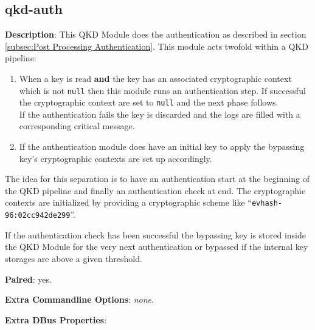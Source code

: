 \subsection{qkd-auth}
\label{subsec:qkd-auth}

\textbf{Description}: This QKD Module does the authentication as described in section \ref{subsec:Post Processing Authentication}. This module acts twofold within a QKD pipeline:

\begin{enumerate}

\item When a key is read \textbf{and} the key has an associated cryptographic context which is not \texttt{null} then this module runs an authentication step. If successful the cryptographic context are set to \texttt{null} and the next phase follows. \\[1em] If the authentication fails the key is discarded and the logs are filled with a corresponding critical message.

\item If the authentication module does have an initial key to apply the bypassing key's cryptographic contexts are set up accordingly.

\end{enumerate}

The idea for this separation is to have an authentication start at the beginning of the QKD pipeline and finally an authentication check at end. The cryptographic contexts are initialized by providing a cryptographic scheme like ``\texttt{evhash-96:02cc942de299}''.

\medskip

If the authentication check has been successful the bypassing key is stored inside the QKD Module for the very next authentication or bypassed if the internal key storages are above a given threshold.

\bigskip

\noindent \textbf{Paired}: yes.

\bigskip

\noindent \textbf{Extra Commandline Options}: \emph{none}.

\bigskip

\noindent \textbf{Extra DBus Properties}: 

\medskip

